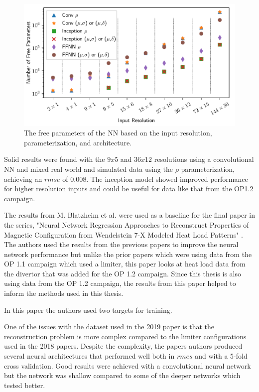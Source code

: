 \begin{figure}[!htb]
    \centering
    \includegraphics[width = \textwidth]{images/daniel-input-parameters.png}
    \caption{The free parameters of the NN based on the input resolution, parameterization, and architecture.} \label{fig:daniel-input-parameters}
\end{figure}

Solid results were found with the $9x5$ and $36x12$ resolutions using a convolutional NN and mixed real world and simulated data using the $\rho$ parameterization, achieving an $rmse$ of 0.008. The inception model showed improved performance for higher resolution inputs and could be useful for data like that from the OP1.2 campaign.

The results from M. Blatzheim et al. were used as a baseline for the final paper in the series, "Neural Network Regression Approaches to Reconstruct Properties of Magnetic Configuration from Wendelstein 7-X Modeled Heat Load Patterns" \cite{Blatzheim_2019}. The authors used the results from the previous papers to improve the neural network performance but unlike the prior papers which were using data from the OP 1.1 campaign which used a limiter, this paper looks at heat load data from the divertor that was added for the OP 1.2 campaign. Since this thesis is also using data from the OP 1.2 campaign, the results from this paper helped to inform the methods used in this thesis.

In this paper the authors used two targets for training.


One of the issues with the dataset used in the 2019 paper is that the reconstruction problem is more complex compared to the limiter configurations used in the 2018 papers. Despite the complexity, the papers authors produced several neural architectures that performed well both in $rmes$ and with a 5-fold cross validation. Good results were achieved with a convolutional neural network but the network was shallow compared to some of the deeper networks which tested better.